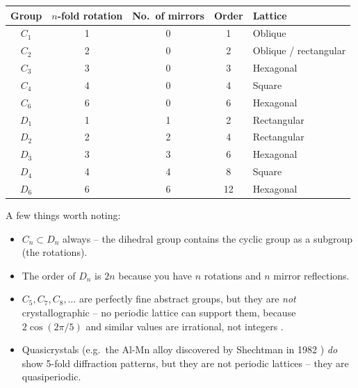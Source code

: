 \documentclass[12pt,a4paper]{article}
\begin{document}
\begin{center}
\renewcommand{\arraystretch}{1.35}
\begin{tabular}{ccccp{4.5cm}}
\toprule
\textbf{Group} & \textbf{$n$-fold rotation} & \textbf{No.\ of mirrors} & \textbf{Order} & \textbf{Lattice} \\
\midrule
$C_1$  & 1 & 0 & 1  & Oblique \\
$C_2$  & 2 & 0 & 2  & Oblique / rectangular \\
$C_3$  & 3 & 0 & 3  & Hexagonal \\
$C_4$  & 4 & 0 & 4  & Square \\
$C_6$  & 6 & 0 & 6  & Hexagonal \\
\midrule
$D_1$  & 1 & 1 & 2  & Rectangular \\
$D_2$  & 2 & 2 & 4  & Rectangular \\
$D_3$  & 3 & 3 & 6  & Hexagonal \\
$D_4$  & 4 & 4 & 8  & Square \\
$D_6$  & 6 & 6 & 12 & Hexagonal \\
\bottomrule
\end{tabular}
\end{center}

\vspace{6pt}
A few things worth noting:
\begin{itemize}
  \item $C_n \subset D_n$ always -- the dihedral group contains the cyclic group as a
        subgroup (the rotations).
  \item The order of $D_n$ is $2n$ because you have $n$ rotations and $n$ mirror reflections.
  \item $C_5, C_7, C_8, \ldots$ are perfectly fine abstract groups, but they are \emph{not}
        crystallographic -- no periodic lattice can support them, because $2\cos(2\pi/5)$
        and similar values are irrational, not integers \cite{Kittel2005, Ashcroft1976}.
  \item Quasicrystals (e.g.\ the Al-Mn alloy discovered by Shechtman in 1982 \cite{Shechtman1984}) \emph{do}
        show 5-fold diffraction patterns, but they are not periodic lattices -- they are
        quasiperiodic.
\end{itemize}
\end{document}
